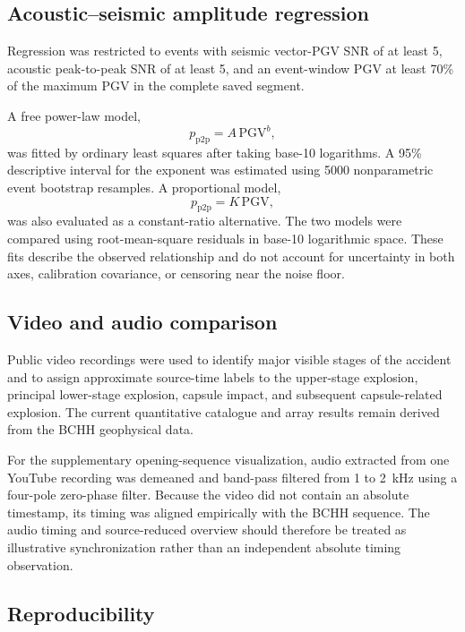 \documentclass[12pt]{article}
\begin{document}
\subsection{Acoustic--seismic amplitude regression}

Regression was restricted to events with seismic vector-PGV SNR of at least 5,
acoustic peak-to-peak SNR of at least 5, and an event-window PGV at least 70\% of
the maximum PGV in the complete saved segment.

A free power-law model,
\begin{equation}
  p_{\mathrm{p2p}} = A\,\mathrm{PGV}^{b},
  \label{eq:free-power-law}
\end{equation}
was fitted by ordinary least squares after taking base-10 logarithms. A 95\%
descriptive interval for the exponent was estimated using 5000 nonparametric
event bootstrap resamples. A proportional model,
\begin{equation}
  p_{\mathrm{p2p}} = K\,\mathrm{PGV},
  \label{eq:proportional-model}
\end{equation}
was also evaluated as a constant-ratio alternative. The two models were compared
using root-mean-square residuals in base-10 logarithmic space. These fits
describe the observed relationship and do not account for uncertainty in both
axes, calibration covariance, or censoring near the noise floor.

\subsection{Video and audio comparison}

Public video recordings were used to identify major visible stages of the
accident and to assign approximate source-time labels to the upper-stage
explosion, principal lower-stage explosion, capsule impact, and subsequent
capsule-related explosion. The current quantitative catalogue and array results
remain derived from the BCHH geophysical data.

For the supplementary opening-sequence visualization, audio extracted from one
YouTube recording was demeaned and band-pass filtered from 1 to \SI{2}{\kilo\hertz}
using a four-pole zero-phase filter. Because the video did not contain an
absolute timestamp, its timing was aligned empirically with the BCHH sequence.
The audio timing and source-reduced overview should therefore be treated as
illustrative synchronization rather than an independent absolute timing
observation.

\subsection{Reproducibility}
\end{document}
